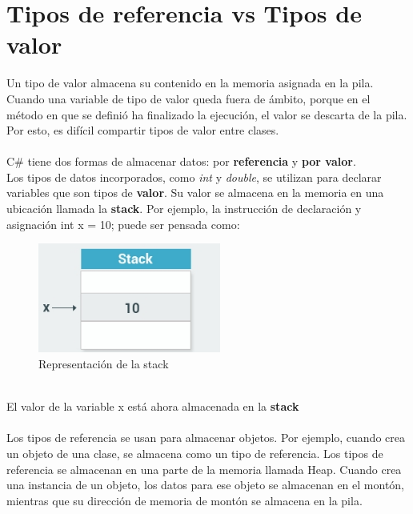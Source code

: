 \documentclass[12pt,a4paper]{report}
\begin{document}
\section{Tipos de referencia vs Tipos de valor}
Un tipo de valor almacena su contenido en la memoria asignada en la pila. Cuando una variable de tipo de valor queda fuera de ámbito, porque en el método en que se definió ha finalizado la ejecución, el valor se descarta de la pila.
Por esto, es difícil compartir tipos de valor entre clases.\\\\C\# tiene dos formas de almacenar datos: por \textbf{referencia} y \textbf{por valor}.\\Los tipos de datos incorporados, como \textit{int} y \textit{double}, se utilizan para declarar variables que son tipos de \textbf{valor}. Su valor se almacena en la memoria en una ubicación llamada la \textbf{stack}.
Por ejemplo, la instrucción de declaración y asignación int x = 10; puede ser pensada como:
\begin{figure}[hbtp]
\centering
\includegraphics[width=6cm]{Csh_Imagenes/Stack.jpg}
\caption{Representación de la stack}
\end{figure}\\El valor de la variable x	 está ahora almacenada en la \textbf{stack}\\\\Los tipos de referencia se usan para almacenar objetos. Por ejemplo, cuando crea un objeto de una clase, se almacena como un tipo de referencia.
Los tipos de referencia se almacenan en una parte de la memoria llamada Heap.
Cuando crea una instancia de un objeto, los datos para ese objeto se almacenan en el montón, mientras que su dirección de memoria de montón se almacena en la pila.
\end{document}

